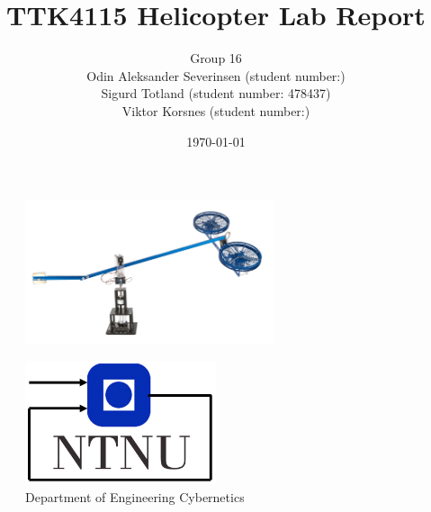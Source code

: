 \documentclass[11pt, a4paper, USenglish]{article} %
\begin{document}
 

\title{TTK4115 Helicopter Lab Report}
\author{
    Group 16\\
    Odin Aleksander Severinsen (student number:)\\
    Sigurd Totland (student number: 478437) \\
    Viktor Korsnes (student number:)
}
\date{\today}
\begin{titlepage}
    \maketitle
    \begin{figure}[htb]
        \centering
        \includegraphics[width=0.65\textwidth]{figures/quanser}
    \end{figure}
    \begin{figure}[b]
        \centering
        \includegraphics[width=0.5\textwidth]{figures/itk_ntnu}\\
        Department of Engineering Cybernetics
    \end{figure}
    \thispagestyle{empty}
\end{titlepage}

\newpage

\thispagestyle{empty} %

\newpage
\tableofcontents
\thispagestyle{empty} %

\newpage
\setcounter{page}{1}

\end{document}
